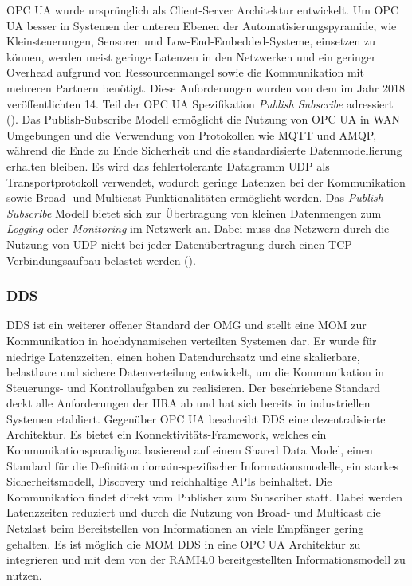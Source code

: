 \ac{OPC UA} wurde ursprünglich als Client-Server Architektur entwickelt. Um \ac{OPC UA} besser in Systemen der unteren Ebenen der Automatisierungspyramide, wie Kleinsteuerungen, Sensoren und Low-End-Embedded-Systeme, einsetzen zu können, werden meist geringe Latenzen in den Netzwerken und ein geringer Overhead aufgrund von Ressourcenmangel sowie die Kommunikation mit mehreren Partnern benötigt. Diese Anforderungen wurden von dem im Jahr 2018 veröffentlichten 14. Teil der \ac{OPC UA} Spezifikation \textit{Publish Subscribe} adressiert (\cite{hoppe2018}). Das Publish-Subscribe Modell ermöglicht die Nutzung von \ac{OPC UA} in \ac{WAN} Umgebungen und die Verwendung von Protokollen wie \ac{MQTT} und \ac{AMQP}, während die Ende zu Ende Sicherheit und die standardisierte Datenmodellierung erhalten bleiben. Es wird das fehlertolerante Datagramm \ac{UDP} als Transportprotokoll verwendet, wodurch geringe Latenzen bei der Kommunikation sowie Broad- und Multicast Funktionalitäten ermöglicht werden. Das \textit{Publish Subscribe} Modell bietet sich zur Übertragung von kleinen Datenmengen zum \textit{Logging} oder \textit{Monitoring} im Netzwerk an. Dabei muss das Netzwern durch die Nutzung von \ac{UDP} nicht bei jeder Datenübertragung durch einen \ac{TCP} Verbindungsaufbau belastet werden (\cite{opcpt1}).

\subsubsection{\ac{DDS}}
\ac{DDS} ist ein weiterer offener Standard der \ac{OMG} und stellt eine \ac{MOM} zur Kommunikation in hochdynamischen verteilten Systemen dar. Er wurde für niedrige Latenzzeiten, einen hohen Datendurchsatz und eine skalierbare, belastbare und sichere Datenverteilung entwickelt, um die Kommunikation in Steuerungs- und Kontrollaufgaben zu realisieren. Der beschriebene Standard deckt alle Anforderungen der \ac{IIRA} ab und hat sich bereits in industriellen Systemen etabliert. Gegenüber \ac{OPC UA} beschreibt \ac{DDS} eine dezentralisierte Architektur. Es bietet ein Konnektivitäts-Framework, welches ein Kommunikationsparadigma basierend auf einem Shared Data Model, einen Standard für die Definition domain-spezifischer Informationsmodelle, ein starkes Sicherheitsmodell, Discovery und reichhal­tige APIs beinhaltet. Die Kommunikation findet direkt vom Publisher zum Subscriber statt. Dabei werden Latenzzeiten reduziert und durch die Nutzung von Broad- und Multicast die Netzlast beim Bereitstellen von Informationen an viele Empfänger gering gehalten. Es ist möglich die \ac{MOM} \ac{DDS} in eine \ac{OPC UA} Architektur zu integrieren und mit dem von der \ac{RAMI4.0} bereitgestellten Informationsmodell zu nutzen.

